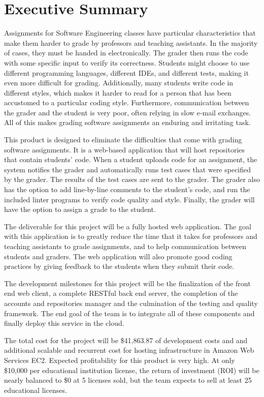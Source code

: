\part*{Executive Summary}

Assignments for Software Engineering classes have particular characteristics
that make them harder to grade by professors and teaching assistants. In the
majority of cases, they must be handed in electronically. The grader then runs
the code with some specific input to verify its correctness. Students might
choose to use different programming languages, different IDEs, and different
tests, making it even more difficult for grading. Additionally, many students
write code in different styles, which makes it harder to read for a person
that has been accustomed to a particular coding style. Furthermore,
communication between the grader and the student is very poor, often relying
in slow e-mail exchanges.  All of this makes grading software assignments an
enduring and irritating task.

This product is designed to eliminate the difficulties that come with grading
software assignments. It is a web-based application that will host
repositories that contain students' code. When a student uploads code for an
assignment, the system notifies the grader and automatically runs test cases
that were specified by the grader. The results of the test cases are sent to
the grader. The grader also has the option to add line-by-line comments to the
student's code, and run the included linter programs to verify code quality
and style. Finally, the grader will have the option to assign a grade to the
student.

The deliverable for this project will be a fully hosted web application. The
goal with this application is to greatly reduce the time that it takes for
professors and teaching assistants to grade assignments, and to help
communication between students and graders. The web application will also
promote good coding practices by giving feedback to the students when they
submit their code.

The development milestones for this project will be the finalization of the
front end web client, a complete RESTful back end server, the completion of
the accounts and repositories manager and the culmination of the testing and
quality framework. The end goal of the team is to integrate all of these
components and finally deploy this service in the cloud.


The total cost for the project will be \$41,863.87 of development costs and
and additional scalable and recurrent cost for hosting infrastructure in
Amazon Web Services EC2. Expected profitability for this product is very high.
At only \$10,000 per educational institution license, the return of investment
(ROI) will be nearly balanced to \$0 at 5 licenses sold, but the team expects
to sell at least 25 educational licenses.

